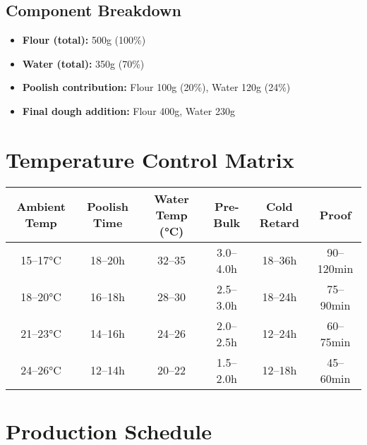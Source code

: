 \documentclass[10pt,a4paper]{article}
\begin{document}
    \subsection{Component Breakdown}
    \begin{itemize}[leftmargin=*]
        \item \textbf{Flour (total):} 500g (100\%)
        \item \textbf{Water (total):} 350g (70\%)
        \item \textbf{Poolish contribution:} Flour 100g (20\%), Water 120g (24\%)
        \item \textbf{Final dough addition:} Flour 400g, Water 230g
    \end{itemize}


    \section{Temperature Control Matrix}

    \begin{table}[h]
        \small
        \begin{tabular}{@{}cccccc@{}}
            \toprule
            \textbf{Ambient Temp} & \textbf{Poolish Time} & \textbf{Water Temp (°C)} & \textbf{Pre-Bulk} & \textbf{Cold Retard} & \textbf{Proof} \\
            \midrule
            15--17°C              & 18--20h               & 32--35                   & 3.0--4.0h         & 18--36h              & 90--120min     \\
            18--20°C              & 16--18h               & 28--30                   & 2.5--3.0h         & 18--24h              & 75--90min      \\
            21--23°C              & 14--16h               & 24--26                   & 2.0--2.5h         & 12--24h              & 60--75min      \\
            24--26°C              & 12--14h               & 20--22                   & 1.5--2.0h         & 12--18h              & 45--60min      \\
            \bottomrule
        \end{tabular}
    \end{table}

    \section{Production Schedule}
\end{document}
